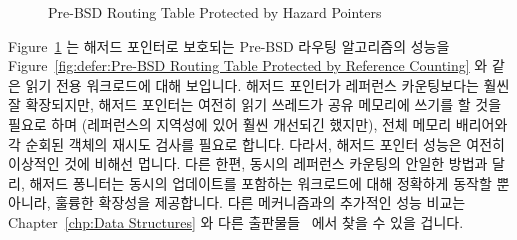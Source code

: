 \begin{figure}[tb]
\centering
{}
\caption{Pre-BSD Routing Table Protected by Hazard Pointers}
\label{fig:defer:Pre-BSD Routing Table Protected by Hazard Pointers}
\end{figure}

Figure~\ref{fig:defer:Pre-BSD Routing Table Protected by Hazard Pointers}
는 해저드 포인터로 보호되는 Pre-BSD 라우팅 알고리즘의 성능을
Figure~\ref{fig:defer:Pre-BSD Routing Table Protected by Reference Counting}
와 같은 읽기 전용 워크로드에 대해 보입니다.
해저드 포인터가 레퍼런스 카운팅보다는 훨씬 잘 확장되지만, 해저드 포인터는
여전히 읽기 쓰레드가 공유 메모리에 쓰기를 할 것을 필요로 하며 (레퍼런스의
지역성에 있어 훨씬 개선되긴 했지만), 전체 메모리 배리어와 각 순회된 객체의
재시도 검사를 필요로 합니다.
다라서, 해저드 포인터 성능은 여전히 이상적인 것에 비해선 멉니다.
다른 한편, 동시의 레퍼런스 카운팅의 안일한 방법과 달리, 해저드 퐁니터는 동시의
업데이트를 포함하는 워크로드에 대해 정확하게 동작할 뿐 아니라, 훌륭한 확장성을
제공합니다.
다른 메커니즘과의 추가적인 성능 비교는
Chapter~\ref{chp:Data Structures}
와 다른
출판물들~\cite{ThomasEHart2007a,McKenney:2013:SDS:2483852.2483867,MagedMichael04a}
에서 찾을 수 있을 겁니다.

\iffalse

